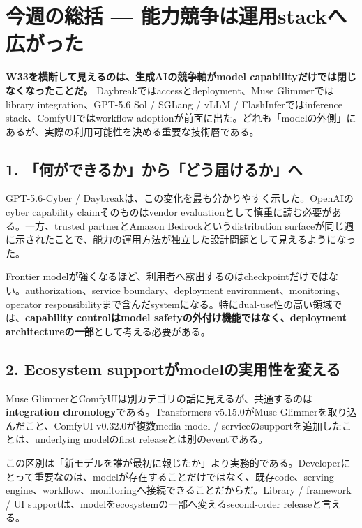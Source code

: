\section{今週の総括 --- 能力競争は運用stackへ広がった}
\label{sec:weekly-synthesis}

\textbf{W33を横断して見えるのは、生成AIの競争軸がmodel capabilityだけでは閉じなくなったことだ。} Daybreakではaccessとdeployment、Muse Glimmerではlibrary integration、GPT-5.6 Sol / SGLang / vLLM / FlashInferではinference stack、ComfyUIではworkflow adoptionが前面に出た。どれも「modelの外側」にあるが、実際の利用可能性を決める重要な技術層である。

\subsection*{1. 「何ができるか」から「どう届けるか」へ}

GPT-5.6-Cyber / Daybreakは、この変化を最も分かりやすく示した。OpenAIのcyber capability claimそのものはvendor evaluationとして慎重に読む必要がある。一方、trusted partnerとAmazon Bedrockというdistribution surfaceが同じ週に示されたことで、能力の運用方法が独立した設計問題として見えるようになった\cite{openai-daybreak-cyber,openai-daybreak-partners,openai-daybreak-aws}。

Frontier modelが強くなるほど、利用者へ露出するのはcheckpointだけではない。authorization、service boundary、deployment environment、monitoring、operator responsibilityまで含んだsystemになる。特にdual-use性の高い領域では、\textbf{capability controlはmodel safetyの外付け機能ではなく、deployment architectureの一部}として考える必要がある。

\subsection*{2. Ecosystem supportがmodelの実用性を変える}

Muse GlimmerとComfyUIは別カテゴリの話に見えるが、共通するのは\textbf{integration chronology}である。Transformers v5.15.0がMuse Glimmerを取り込んだこと、ComfyUI v0.32.0が複数media model / serviceのsupportを追加したことは、underlying modelのfirst releaseとは別のeventである\cite{hf-transformers-515,comfyui-0320}。

この区別は「新モデルを誰が最初に報じたか」より実務的である。Developerにとって重要なのは、modelが存在することだけではなく、既存code、serving engine、workflow、monitoringへ接続できることだからだ。Library / framework / UI supportは、modelをecosystemの一部へ変えるsecond-order releaseと言える。


